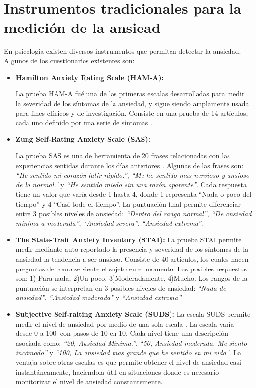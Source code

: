 \section{Instrumentos tradicionales para la medici\'on de la ansiead}
        En psicolog\'ia existen diversos instrumentos que permiten detectar la ansiedad. Algunos de los cuestionarios existentes son:
        \begin{itemize}

		\item \textbf{Hamilton Anxiety Rating Scale (HAM-A):}

			La prueba HAM-A fu\'e una de las primeras escalas desarrolladas para medir la severidad de los s\'intomas de la ansiedad, y sigue siendo amplamente usada para fines cl\'inicos y de investigaci\'on. Consiste en una prueba de 14 art\'iculos, cada uno definido por una serie de s\'intomas \citep{PAPT467}.
		\item \textbf{Zung Self-Rating Anxiety Scale (SAS):}

			La prueba SAS es una de herramienta de 20 frases relacionadas con las experiencias sentidas durante los d\'ias anteriores \citep{Zung1971371}. Algunas de las frases son: \textit{``He sentido mi coraz\'on latir r\'apido.''}, \textit{``Me he sentido mas nervioso y ansioso de lo normal.''} y \textit{``He sentido miedo sin una raz\'on aparente''}. Cada respuesta tiene un valor que var\'ia desde 1 hasta 4, donde 1 representa ``Nada o poco del tiempo'' y 4 ``Casi todo el tiempo''. La puntuaci\'on final permite diferenciar entre 3 posibles niveles de ansiedad: \textit{``Dentro del rango normal''}, \textit{``De ansiedad m\'inima a moderada''}, \textit{``Ansiedad severa''}, \textit{``Ansiedad extrema''}.
		\item \textbf{The State-Trait Anxiety Inventory (STAI):}
			La prueba STAI permite medir mediante auto-reportado la presencia y severidad de los s\'intomas de la ansiedad la tendencia a ser ansioso\citep{julian2011measures}. Consiste de 40 art\'iculos, los cuales hacen preguntas de como se siente el sujeto en el momento. Las posibles respuestas son: 1) Para nada, 2)Un poco, 3)Moderadamente, 4)Mucho. Los rangos de la puntuaci\'on se interpretan en 3 posibles niveles de ansiedad: \textit{``Nada de ansiedad''}, \textit{``Ansiedad moderada''} y \textit{``Ansiedad extrema''}

		\item \textbf{Subjective Self-raiting Anxiety Scale (SUDS):}
			La escala SUDS permite medir el nivel de ansiedad por medio de una sola escala \citep{wolpe1973practice}. La escala var\'ia desde 0 a 100, con pasos de 10 en 10. Cada nivel tiene una descripci\'on asociada como: \textit{``20, Ansiedad M\'inima.''}, \textit{``50, Ansiedad moderada. Me siento inc\'omodo''} y \textit{``100, La ansiedad mas grande que he sentido en mi vida''}. La ventaja sobre otras escalas es que permite obtener el nivel de ansiedad casi instant\'aneamente, haciendola \'util en situaciones donde es necesario monitorizar el nivel de ansiedad constantemente.
        \end{itemize}


